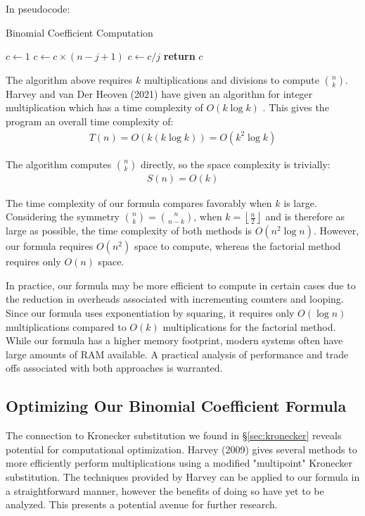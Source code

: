 \documentclass{article}
\theoremstyle{plain}
\theoremstyle{definition}
\begin{document}
In pseudocode:
\begin{algorithm}
\caption{Binomial Coefficient Computation}
\begin{algorithmic}[1]
    \State \( c \leftarrow 1 \)
        \State \( c \leftarrow c \times (n - j + 1) \)
        \State \( c \leftarrow c / j \)
    \EndFor
    \State \textbf{return} \( c \)
\EndFunction
\end{algorithmic}
\end{algorithm}

The algorithm above requires $k$ multiplications and divisions to compute $\binom{n}{k}$. Harvey and van Der Heoven (2021) have given an algorithm for integer multiplication which has a time complexity of $O(k \log{k})$ \cite{harveyvanderhoeven2021}. This gives the program an overall time complexity of:
\begin{align*}
    T(n) = O(k (k \log{k})) = O(k^2 \log{k})
\end{align*}

The algorithm computes $\binom{n}{k}$ directly, so the space complexity is trivially:
\begin{align*}
    S(n) = O(k)
\end{align*}

The time complexity of our formula compares favorably when $k$ is large. Considering the symmetry $\binom{n}{k} = \binom{n}{n-k}$, when $k = \left\lfloor \frac{n}{2} \right\rfloor$ and is therefore as large as possible, the time complexity of both methods is $O(n^2 \log{n})$. However, our formula requires $O(n^2)$ space to compute, whereas the factorial method requires only $O(n)$ space.

In practice, our formula may be more efficient to compute in certain cases due to the reduction in overheads associated with incrementing counters and looping. Since our formula uses exponentiation by squaring, it requires only $O(\log{n})$ multiplications compared to $O(k)$ multiplications for the factorial method. While our formula has a higher memory footprint, modern systems often have large amounts of RAM available. A practical analysis of performance and trade offs associated with both approaches is warranted.

\subsection{Optimizing Our Binomial Coefficient Formula}
The connection to Kronecker substitution we found in \S \ref{sec:kronecker} reveals potential for computational optimization. Harvey (2009) \cite{harvey2009kronecker} gives several methods to more efficiently perform multiplications using a modified "multipoint" Kronecker substitution. The techniques provided by Harvey can be applied to our formula in a straightforward manner, however the benefits of doing so have yet to be analyzed. This presents a potential avenue for further research.
\end{document}
